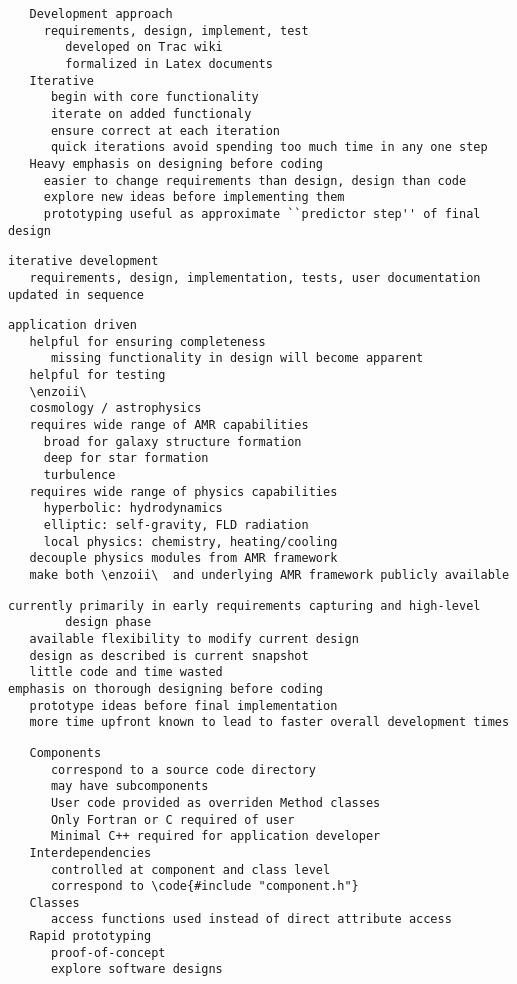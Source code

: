 \documentclass[10pt]{article}
\begin{document}
\begin{verbatim}
   Development approach
     requirements, design, implement, test
        developed on Trac wiki
        formalized in Latex documents
   Iterative
      begin with core functionality
      iterate on added functionaly
      ensure correct at each iteration
      quick iterations avoid spending too much time in any one step
   Heavy emphasis on designing before coding
     easier to change requirements than design, design than code
     explore new ideas before implementing them
     prototyping useful as approximate ``predictor step'' of final design
\end{verbatim}
\begin{verbatim}
iterative development
   requirements, design, implementation, tests, user documentation updated in sequence
\end{verbatim}



\begin{verbatim}
application driven
   helpful for ensuring completeness
      missing functionality in design will become apparent
   helpful for testing
   \enzoii\ 
   cosmology / astrophysics
   requires wide range of AMR capabilities
     broad for galaxy structure formation
     deep for star formation
     turbulence
   requires wide range of physics capabilities
     hyperbolic: hydrodynamics
     elliptic: self-gravity, FLD radiation
     local physics: chemistry, heating/cooling
   decouple physics modules from AMR framework
   make both \enzoii\  and underlying AMR framework publicly available
\end{verbatim}

\begin{verbatim}
currently primarily in early requirements capturing and high-level 
        design phase
   available flexibility to modify current design
   design as described is current snapshot
   little code and time wasted
emphasis on thorough designing before coding
   prototype ideas before final implementation
   more time upfront known to lead to faster overall development times
\end{verbatim}

\begin{verbatim}
   Components
      correspond to a source code directory
      may have subcomponents
      User code provided as overriden Method classes
      Only Fortran or C required of user
      Minimal C++ required for application developer
   Interdependencies  
      controlled at component and class level
      correspond to \code{#include "component.h"}
   Classes
      access functions used instead of direct attribute access
   Rapid prototyping
      proof-of-concept
      explore software designs
\end{verbatim}
\end{document}
